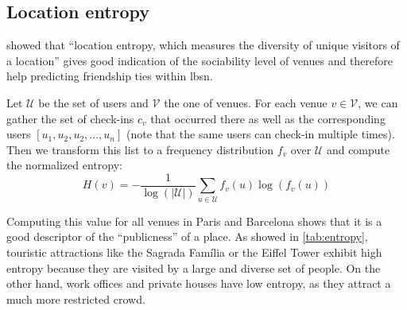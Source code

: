 \subsection{Location entropy}

\Textcite{Entropy10} showed that \enquote{location entropy, which measures the
diversity of unique visitors of a location} gives good indication of the
sociability level of venues and therefore help predicting friendship ties within
\gls{lbsn}.

Let $\mathcal{U}$ be the set of users and $\mathcal{V}$ the one of venues. For
each venue $v \in \mathcal{V}$, we can gather the set of check-ins $c_v$ that
occurred there as well as the corresponding users $[u_1, u_2, u_2, \ldots,
u_n]$ (note that the same users can check-in multiple times). Then we
transform this list to a frequency distribution $f_v$ over $\mathcal{U}$ and
compute the normalized entropy: \[
    H(v) = -\frac{1}{\log\left(\left| \mathcal{U}\right|\right)}
\sum_{u\in \mathcal{U}} f_v(u) \log(f_v(u)) \]

Computing this value for all venues in Paris and Barcelona shows that it is a
good descriptor of the \enquote{publicness} of a place. As showed in
\autoref{tab:entropy}, touristic attractions like the Sagrada Família or the
Eiffel Tower exhibit high entropy because they are visited by a large and
diverse set of people. On the other hand, work offices and private houses have
low entropy, as they attract a much more restricted crowd.

